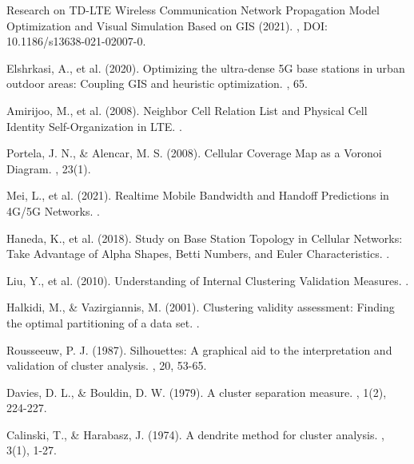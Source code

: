 \documentclass[12pt,a4paper]{report}
\begin{document}
\begin{thebibliography}{40}
Research on TD-LTE Wireless Communication Network Propagation Model Optimization and Visual Simulation Based on GIS (2021).
, DOI: 10.1186/s13638-021-02007-0.

Elshrkasi, A., et al. (2020).
\newblock Optimizing the ultra-dense 5G base stations in urban outdoor areas: Coupling GIS and heuristic optimization.
, 65.

Amirijoo, M., et al. (2008).
\newblock Neighbor Cell Relation List and Physical Cell Identity Self-Organization in LTE.
.

Portela, J. N., \& Alencar, M. S. (2008).
\newblock Cellular Coverage Map as a Voronoi Diagram.
, 23(1).

Mei, L., et al. (2021).
\newblock Realtime Mobile Bandwidth and Handoff Predictions in 4G/5G Networks.
.

Haneda, K., et al. (2018).
\newblock Study on Base Station Topology in Cellular Networks: Take Advantage of Alpha Shapes, Betti Numbers, and Euler Characteristics.
.

Liu, Y., et al. (2010).
\newblock Understanding of Internal Clustering Validation Measures.
.

Halkidi, M., \& Vazirgiannis, M. (2001).
\newblock Clustering validity assessment: Finding the optimal partitioning of a data set.
.

Rousseeuw, P. J. (1987).
\newblock Silhouettes: A graphical aid to the interpretation and validation of cluster analysis.
, 20, 53-65.

Davies, D. L., \& Bouldin, D. W. (1979).
\newblock A cluster separation measure.
, 1(2), 224-227.

Calinski, T., \& Harabasz, J. (1974).
\newblock A dendrite method for cluster analysis.
, 3(1), 1-27.


\end{thebibliography}
\end{document}
